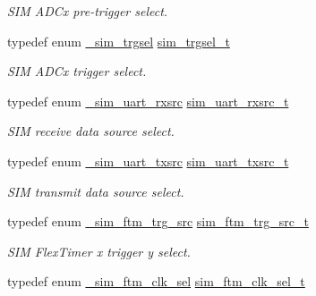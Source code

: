 \begin{DoxyCompactItemize}
\begin{DoxyCompactList}\small\item\em S\+IM A\+D\+Cx pre-\/trigger select. \end{DoxyCompactList}\item 
typedef enum \hyperlink{group__sim__hal_ga54baea382a34e3448223fe9625e0d126}{\+\_\+sim\+\_\+trgsel} \hyperlink{group__sim__hal_ga5bd34cf2c7d81265882d1b79534b43c0}{sim\+\_\+trgsel\+\_\+t}\hypertarget{group__sim__hal_ga5bd34cf2c7d81265882d1b79534b43c0}{}\label{group__sim__hal_ga5bd34cf2c7d81265882d1b79534b43c0}

\begin{DoxyCompactList}\small\item\em S\+IM A\+D\+Cx trigger select. \end{DoxyCompactList}\item 
typedef enum \hyperlink{group__sim__hal_gaeb8ae2e1a56a4095cc8a137be3760917}{\+\_\+sim\+\_\+uart\+\_\+rxsrc} \hyperlink{group__sim__hal_gab6fb25254f344eecbd4c71ff1254c6d0}{sim\+\_\+uart\+\_\+rxsrc\+\_\+t}\hypertarget{group__sim__hal_gab6fb25254f344eecbd4c71ff1254c6d0}{}\label{group__sim__hal_gab6fb25254f344eecbd4c71ff1254c6d0}

\begin{DoxyCompactList}\small\item\em S\+IM receive data source select. \end{DoxyCompactList}\item 
typedef enum \hyperlink{group__sim__hal_gac2baf3c3f9f2c2cb016fd88de79a400b}{\+\_\+sim\+\_\+uart\+\_\+txsrc} \hyperlink{group__sim__hal_gaed9f8dc3d5b7d57cc35c192ef9ea30cb}{sim\+\_\+uart\+\_\+txsrc\+\_\+t}\hypertarget{group__sim__hal_gaed9f8dc3d5b7d57cc35c192ef9ea30cb}{}\label{group__sim__hal_gaed9f8dc3d5b7d57cc35c192ef9ea30cb}

\begin{DoxyCompactList}\small\item\em S\+IM transmit data source select. \end{DoxyCompactList}\item 
typedef enum \hyperlink{group__sim__hal_ga8f96c79e1fb5ece73bc80a330714de84}{\+\_\+sim\+\_\+ftm\+\_\+trg\+\_\+src} \hyperlink{group__sim__hal_ga51391f8c8388e0b84b93bbded825d57b}{sim\+\_\+ftm\+\_\+trg\+\_\+src\+\_\+t}\hypertarget{group__sim__hal_ga51391f8c8388e0b84b93bbded825d57b}{}\label{group__sim__hal_ga51391f8c8388e0b84b93bbded825d57b}

\begin{DoxyCompactList}\small\item\em S\+IM Flex\+Timer x trigger y select. \end{DoxyCompactList}\item 
typedef enum \hyperlink{group__sim__hal_ga5edbf6726ed48c8c0973f02fb20eb224}{\+\_\+sim\+\_\+ftm\+\_\+clk\+\_\+sel} \hyperlink{group__sim__hal_ga553da71353180a7044fe2b2c2bc7456e}{sim\+\_\+ftm\+\_\+clk\+\_\+sel\+\_\+t}\hypertarget{group__sim__hal_ga553da71353180a7044fe2b2c2bc7456e}{}\label{group__sim__hal_ga553da71353180a7044fe2b2c2bc7456e}


\end{DoxyCompactItemize}
